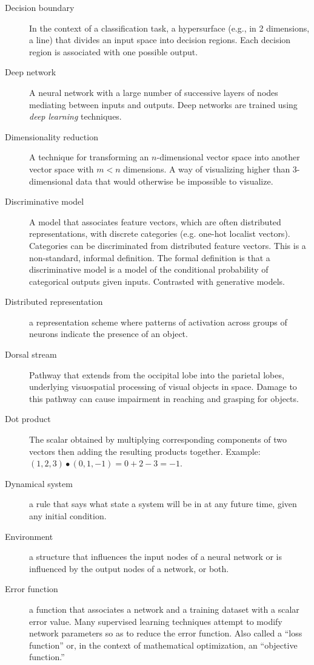 \begin{description}
\item[Decision boundary] In the context of a classification task, a hypersurface (e.g., in 2 dimensions, a line) that divides an input space into decision regions. Each decision region is associated with one possible output.
\item[Deep network] A neural network with a large number of successive layers of nodes mediating between inputs and outputs. Deep networks are trained using \emph{deep learning} techniques.
\item[Dimensionality reduction] A technique for transforming an $n$-dimensional vector space into another vector space with $m<n$ dimensions. A way of visualizing higher than 3-dimensional data that would otherwise be impossible to visualize.
\item[Discriminative model] A model that associates feature vectors, which are often distributed representations, with discrete categories (e.g. one-hot localist vectors).  Categories can be discriminated from distributed feature vectors. This is a non-standard, informal definition. The formal definition is that a discriminative model is a model of the conditional probability of categorical outputs given inputs. Contrasted with generative models.
\item[Distributed representation] a representation scheme where patterns of activation across groups of neurons indicate the presence of an object. 
\item[Dorsal stream] Pathway that extends from the occipital lobe into the parietal lobes, underlying visuospatial processing of visual objects in space. Damage to this pathway can cause impairment in reaching and grasping for objects. 
\item[Dot product] The scalar obtained by multiplying corresponding components of two vectors then adding the resulting products together. Example: $(1,2,3) \bullet (0,1,-1) = 0+2-3 = -1$.
\item[Dynamical system] a rule that says what state a system will be in at any future time, given any initial condition.
\item[Environment] a structure that influences the input nodes of a neural network or is influenced by the output nodes of a network, or both.
\item[Error function] a function that associates a network and a training dataset with a scalar error value. Many supervised learning techniques attempt to modify network parameters so as to reduce the error function. Also called a ``loss function'' or, in the context of mathematical optimization, an ``objective function.''

\end{description}
